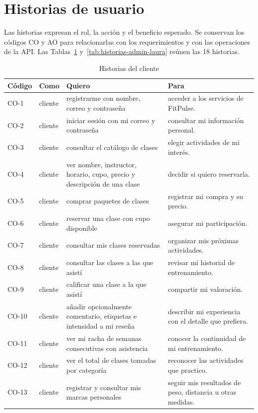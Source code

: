 \section{Historias de usuario}\label{sec:historias-laura}
Las historias expresan el rol, la acción y el beneficio esperado. Se conservan los códigos CO y AO para relacionarlas con los requerimientos y con las operaciones de la API. Las Tablas~\ref{tab:historias-clientes-laura} y~\ref{tab:historias-admin-laura} reúnen las 18 historias.
\begin{table}[!t]
\caption{Historias del cliente}\label{tab:historias-clientes-laura}
\centering\small
\begin{tabular}{p{}p{}p{}p{}}\toprule
Código & Como & Quiero & Para \\ \midrule
CO-1 & cliente & registrarme con nombre, correo y contraseña & acceder a los servicios de FitPulse. \\
CO-2 & cliente & iniciar sesión con mi correo y contraseña & consultar mi información personal. \\
CO-3 & cliente & consultar el catálogo de clases & elegir actividades de mi interés. \\
CO-4 & cliente & ver nombre, instructor, horario, cupo, precio y descripción de una clase & decidir si quiero reservarla. \\
CO-5 & cliente & comprar paquetes de clases & registrar mi compra y su precio. \\
CO-6 & cliente & reservar una clase con cupo disponible & asegurar mi participación. \\
CO-7 & cliente & consultar mis clases reservadas & organizar mis próximas actividades. \\
CO-8 & cliente & consultar las clases a las que asistí & revisar mi historial de entrenamiento. \\
CO-9 & cliente & calificar una clase a la que asistí & compartir mi valoración. \\
CO-10 & cliente & añadir opcionalmente comentario, etiquetas e intensidad a mi reseña & describir mi experiencia con el detalle que prefiera. \\
CO-11 & cliente & ver mi racha de semanas consecutivas con asistencia & conocer la continuidad de mi entrenamiento. \\
CO-12 & cliente & ver el total de clases tomadas por categoría & reconocer las actividades que practico. \\
CO-13 & cliente & registrar y consultar mis marcas personales & seguir mis resultados de peso, distancia u otras medidas. \\
\bottomrule\end{tabular}
\end{table}
